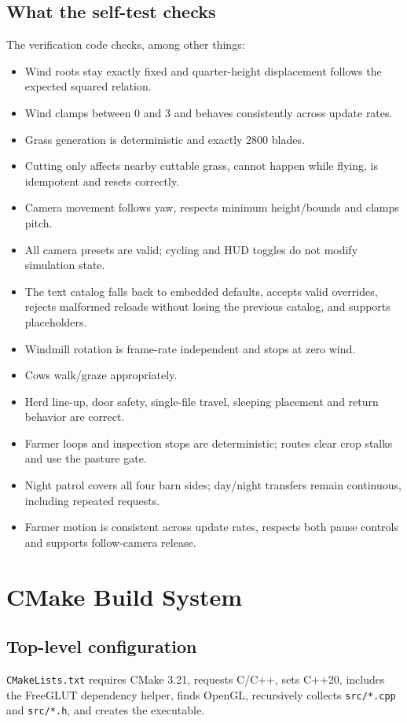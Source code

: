 \documentclass[11pt,a4paper,openany]{book}
\newcommand{\file}[1]{\nolinkurl{#1}}
\begin{document}
\section{What the self-test checks}
The verification code checks, among other things:
\begin{itemize}
	\item Wind roots stay exactly fixed and quarter-height displacement follows the expected squared relation.
	\item Wind clamps between 0 and 3 and behaves consistently across update rates.
	\item Grass generation is deterministic and exactly 2800 blades.
	\item Cutting only affects nearby cuttable grass, cannot happen while flying, is idempotent and resets correctly.
	\item Camera movement follows yaw, respects minimum height/bounds and clamps pitch.
	\item All camera presets are valid; cycling and HUD toggles do not modify simulation state.
	\item The text catalog falls back to embedded defaults, accepts valid overrides, rejects malformed reloads without losing the previous catalog, and supports placeholders.
	\item Windmill rotation is frame-rate independent and stops at zero wind.
	\item Cows walk/graze appropriately.
	\item Herd line-up, door safety, single-file travel, sleeping placement and return behavior are correct.
	\item Farmer loops and inspection stops are deterministic; routes clear crop stalks and use the pasture gate.
	\item Night patrol covers all four barn sides; day/night transfers remain continuous, including repeated requests.
	\item Farmer motion is consistent across update rates, respects both pause controls and supports follow-camera release.
\end{itemize}

\chapter{CMake Build System}
\section{Top-level configuration}
\file{CMakeLists.txt} requires CMake 3.21, requests C/C++, sets C++20, includes the FreeGLUT dependency helper, finds OpenGL, recursively collects \file{src/*.cpp} and \file{src/*.h}, and creates the executable.
\end{document}
